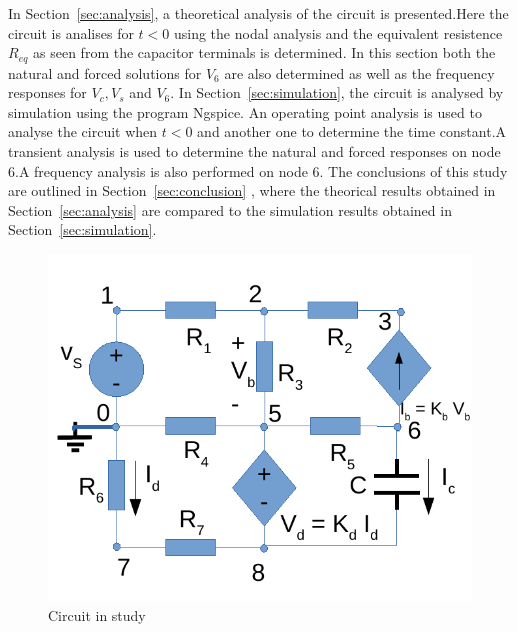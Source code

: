 In Section~\ref{sec:analysis}, a theoretical analysis of the circuit is
presented.Here the circuit is analises for $t<0$ using the nodal analysis and the equivalent resistence $R_{eq}$ as seen from the capacitor terminals is determined. In this section both the natural and forced solutions for $V_6$ are also determined as well as the frequency responses for $V_c, V_s$ and $V_6 $. In Section~\ref{sec:simulation}, the circuit is analysed by
simulation using the program Ngspice. An operating point analysis is used to analyse the circuit when $t<0$ and another one to determine the time constant.A transient analysis is used to determine the natural and forced responses on node 6.A frequency analysis is also performed on node 6. The conclusions of this study are outlined in
Section~\ref{sec:conclusion} , where the theorical results obtained in
Section~\ref{sec:analysis} are compared to the simulation results obtained in
Section~\ref{sec:simulation}.

\begin{figure}[h] \centering
\includegraphics[width=0.6\linewidth]{circuit_t2.pdf}
\caption{Circuit in study}
\label{fig:circuit_t2}
\end{figure}



